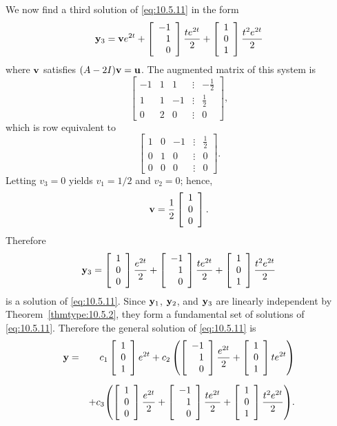 \begin{examplesolution}
We now find a third solution of \eqref{eq:10.5.11} in the form
\[
  {\bf y}_{3}={\bf v}e^{2t}+\left[\begin{array}{r}-1\\1\\0\end{array}\right]{\frac{te^{2t}}{2}}+\left[\begin{array}{r}1\\0\\1\end{array}\right]{\frac{t^{2}e^{2t}}{2}}
\]
where ${\bf v}$ satisfies $(A-2I){\bf v}={\bf u}$. The augmented matrix of this system is
\[
  \left[
  \begin{array}{rrrcr}
    -1 & 1 & 1  & \vdots & -\frac{1}{2} \\
    1  & 1 & -1 & \vdots & \frac{1}{2}  \\
    0  & 2 & 0  & \vdots & 0
  \end{array}\right],
\]
which is row equivalent to
\[
  \left[
  \begin{array}{rrrcr}
    1 & 0 & -1 & \vdots & \frac{1}{2} \\
    0 & 1 & 0  & \vdots & 0           \\
    0 & 0 & 0  & \vdots & 0
  \end{array}\right].
\]
Letting $v_{3}=0$ yields $v_{1}=1/2$ and $v_{2}=0$; hence,
\[
  {\bf v}=\frac{1}{2}\left[\begin{array}{r}1\\0\\0\end{array}\right].
\]
Therefore
\[
  {\bf y}_{3}=\left[\begin{array}{r}1\\0\\0\end{array}\right]{\frac{e^{2t}}{2}}+ \left[\begin{array}{r}-1\\1\\0\end{array}\right]{\frac{te^{2t}}{2}}+\left[\begin{array}{r}1\\0\\1\end{array}\right]{\frac{t^{2}e^{2t}}{2}}
\]
is a solution of \eqref{eq:10.5.11}. Since ${\bf y}_{1}$, ${\bf y}_{2}$, and ${\bf y}_{3}$ are
linearly independent by Theorem~\ref{thmtype:10.5.2}, they form a fundamental set of solutions of
\eqref{eq:10.5.11}. Therefore the general solution of \eqref{eq:10.5.11} is
\begin{eqnarray*}
  {\bf y} & = & \displaystyle{c_{1}\left[\begin{array}{r}1\\0\\1\end{array}\right]e^{2t}+c_{2}\left(\left[\begin{array}{r}-1\\1\\0\end{array}\right]{\frac{e^{2t}}{2}}+\left[\begin{array}{r}1\\0\\1\end{array}\right]te^{2t}\right)} \\[2\jot]
          &   & +c_{3}\displaystyle{\left(\left[\begin{array}{r}1\\0\\0\end{array}\right]{\frac{e^{2t}}{2}}+\left[\begin{array}{r}-1\\1\\0\end{array}\right]{\frac{te^{2t}}{2}}+\left[\begin{array}{r}1\\0\\1\end{array}\right]{\frac{t^{2}e^{2t}}{2}}\right)}.
\end{eqnarray*}
\end{examplesolution}

\enlargethispage{1in}


